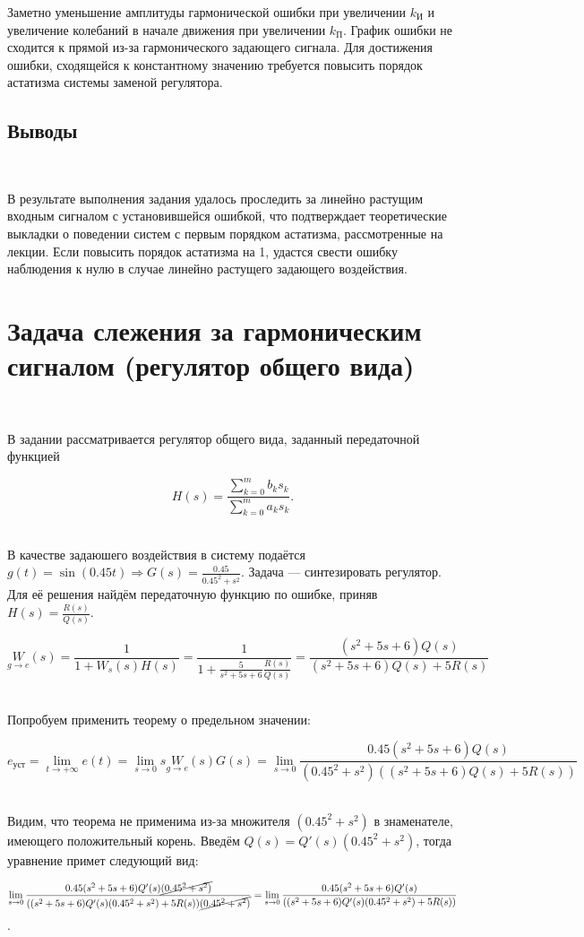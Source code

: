 \documentclass[a4paper]{article}
\begin{document}
Заметно уменьшение амплитуды гармонической ошибки при увеличении $k_{\text{И}}$ и увеличение колебаний в начале движения при увеличении $k_{\text{П}}$. График ошибки не сходится к прямой из-за гармонического задающего сигнала. Для достижения ошибки, сходящейся к константному значению требуется повысить порядок астатизма системы заменой регулятора.

\subsection{Выводы}\

В результате выполнения задания удалось проследить за линейно растущим входным сигналом с установившейся ошибкой, что подтверждает теоретические выкладки о поведении систем с первым порядком астатизма, рассмотренные на лекции. Если повысить порядок астатизма на 1, удастся свести ошибку наблюдения к нулю в случае линейно растущего задающего воздействия. 

\section{Задача слежения за гармоническим сигналом (регулятор общего вида)}\

В задании рассматривается регулятор общего вида, заданный передаточной функцией

$$
H(s) = \frac{\sum_{k=0}^{m}b_ks_k}{\sum_{k=0}^{m}a_ks_k}.
$$\

В качестве задаюшего воздействия в систему подаётся $g(t) = \sin{(0.45t)} \Rightarrow G(s) = \frac{0.45}{0.45^2 + s^2}$. Задача --- синтезировать регулятор. Для её решения найдём передаточную функцию по ошибке, приняв $H(s) = \frac{R(s)}{Q(s)}$. 

$$\underset{g\to e}{W}(s) = \frac{1}{1+W_s(s)H(s)} = \frac{1}{1+\frac{5}{s^2+5s+6}\frac{R(s)}{Q(s)}} = \frac{(s^2+5s+6)Q(s)}{(s^2+5s+6)Q(s)+5R(s)}$$\

Попробуем применить теорему о предельном значении:

$$e_{\text{уст}} = \lim_{t\to +\infty} e(t) = \lim_{s\to 0} s\underset{g\to e}{W}(s) G(s) = \lim_{s\to 0}\frac{0.45(s^2+5s+6)Q(s)}{(0.45^2 + s^2)((s^2+5s+6)Q(s)+5R(s))}$$\

Видим, что теорема не применима из-за множителя $(0.45^2 + s^2)$ в знаменателе, имеющего положительный корень. Введём $Q(s) = Q'(s)(0.45^2 + s^2)$, тогда уравнение примет следующий вид:

$$\lim_{s\to 0}\frac{0.45(s^2+5s+6)Q'(s)\cancel{(0.45^2 + s^2)}}{((s^2+5s+6)Q'(s)(0.45^2 + s^2)+5R(s))\cancel{(0.45^2 + s^2)}} = \lim_{s\to 0}\frac{0.45(s^2+5s+6)Q'(s)}{((s^2+5s+6)Q'(s)(0.45^2 + s^2)+5R(s))}$$.\
\end{document}
